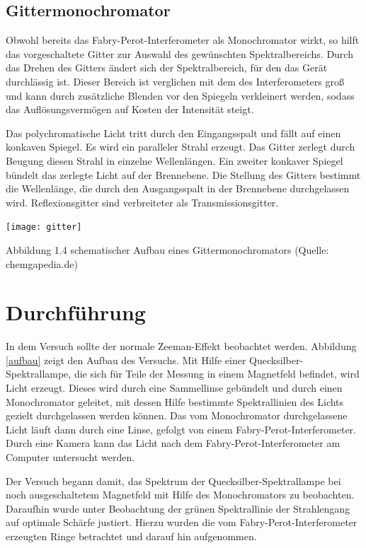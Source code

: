 \documentclass[10pt,a4paper]{article}
\begin{document}
\subsection{ Gittermonochromator}

Obwohl bereits das Fabry-Perot-Interferometer als Monochromator wirkt, so hilft das vorgeschaltete Gitter zur Auswahl des gewünschten Spektralbereichs. Durch das Drehen des Gitters ändert sich der Spektralbereich, für den das Gerät durchlässig ist. Dieser Bereich ist verglichen mit dem des Interferometers groß und kann durch zusätzliche Blenden vor den Spiegeln verkleinert werden, sodass das Auflösungsvermögen auf Kosten der Intensität steigt. 

Das polychromatische Licht tritt durch den Eingangsspalt und fällt auf einen konkaven Spiegel. Es wird ein paralleler Strahl erzeugt. Das Gitter zerlegt durch Beugung diesen Strahl in einzelne Wellenlängen. Ein zweiter konkaver Spiegel bündelt das zerlegte Licht auf der Brennebene. Die Stellung des Gitters bestimmt die Wellenlänge, die durch den Ausgangsspalt in der Brennebene durchgelassen wird. Reflexionsgitter sind verbreiteter als Transmissionsgitter.

\texttt{[image: gitter]}

Abbildung 1.4 schematischer Aufbau eines Gittermonochromators (Quelle: chemgapedia.de)

\section{Durchführung}

In dem Versuch sollte der normale Zeeman-Effekt beobachtet werden. Abbildung \ref{aufbau} zeigt den Aufbau des Versuchs. Mit Hilfe einer Quecksilber-Spektrallampe, die sich für Teile der Messung in einem Magnetfeld befindet, wird Licht erzeugt. Dieses wird durch eine Sammellinse gebündelt und durch einen Monochromator geleitet, mit dessen Hilfe bestimmte Spektrallinien des Lichts gezielt durchgelassen werden können. Das vom Monochromator durchgelassene Licht läuft dann durch eine Linse, gefolgt von einem Fabry-Perot-Interferometer. Durch eine Kamera kann das Licht nach dem Fabry-Perot-Interferometer am Computer untersucht werden. 

Der Versuch begann damit, das Spektrum der Quecksilber-Spektrallampe bei noch ausgeschaltetem Magnetfeld mit Hilfe des Monochromators zu beobachten. Daraufhin wurde unter Beobachtung der grünen Spektrallinie der Strahlengang auf optimale Schärfe justiert. Hierzu wurden die vom Fabry-Perot-Interferometer erzeugten Ringe betrachtet und darauf hin aufgenommen.
\end{document}
